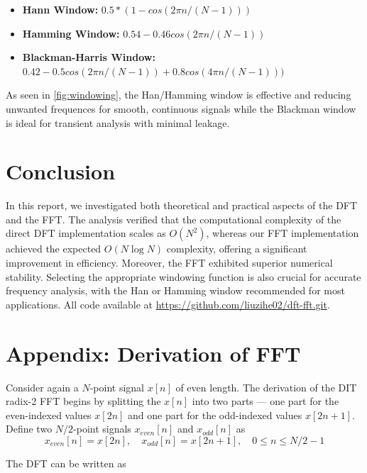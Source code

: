 \documentclass[8pt]{extarticle}
\begin{document}
\begin{itemize}
    \item \textbf{Hann Window:} $0.5*(1-cos(2\pi n / (N - 1)))$
    \item \textbf{Hamming Window:} $0.54-0.46cos(2\pi n / (N - 1))$
    \item \textbf{Blackman-Harris Window:} $0.42-0.5cos(2\pi n / (N - 1))+0.8cos(4\pi n / (N - 1)))$
\end{itemize}

As seen in \autoref{fig:windowing}, the Han/Hamming window is effective and reducing unwanted frequences for smooth, continuous signals while the Blackman window is ideal for transient analysis with minimal leakage.



\section{Conclusion}

In this report, we investigated both theoretical and practical aspects of the DFT and the FFT. The analysis verified that the computational complexity of the direct DFT implementation scales as \(O(N^2)\), whereas our FFT implementation achieved the expected \(O(N \log N)\) complexity, offering a significant improvement in efficiency. Moreover, the FFT exhibited superior numerical stability. Selecting the appropriate windowing function is also crucial for accurate frequency analysis, with the Han or Hamming window recommended for most applications. All code available at \url{https://github.com/liuzihe02/dft-fft.git}.

\newpage
\appendix

\section*{Appendix: Derivation of FFT}
\label{app:fft_proof}

Consider again a $N$-point signal $x[n]$ of even length. The derivation of the DIT radix-2 FFT begins by splitting the $x[n]$ into two parts --- one part for the even-indexed values $x[2n]$ and one part for the odd-indexed values $x[2n + 1]$. Define two $N/2$-point signals $x_{even}[n]$ and $x_{odd}[n]$ as
\begin{equation*}
x_{even}[n] = x[2n], \quad x_{odd}[n] = x[2n + 1], \quad 0 \leq n \leq N/2-1
\end{equation*}

The DFT can be written as
\end{document}
